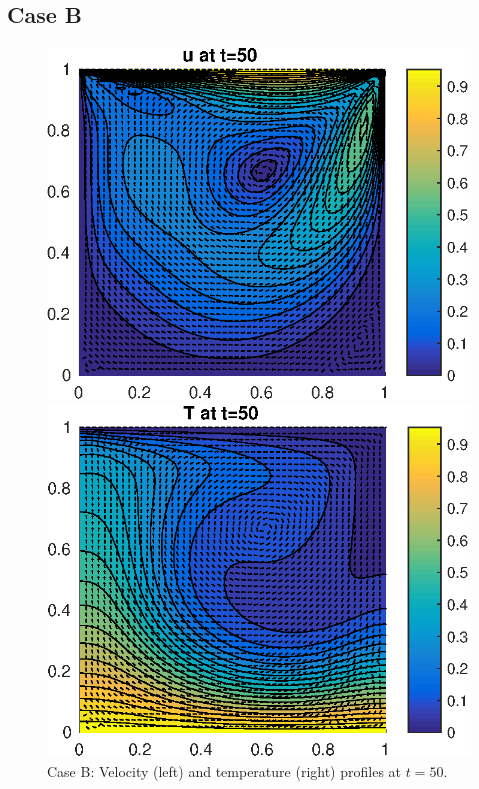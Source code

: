 \documentclass[10pt,a4paper]{article}
\begin{document}
\subsection{Case B}

\begin{figure}[H]
\centering
\begin{minipage}{.5\textwidth}
  \centering
  \includegraphics[width=.9\linewidth]{Part1_Case_B_Velocity.eps}
\end{minipage}%
\begin{minipage}{.5\textwidth}
  \centering
  \includegraphics[width=.9\linewidth]{Part1_Case_B_Temp.eps}
\end{minipage}
\caption{Case B: Velocity (left) and temperature (right) profiles at $t = 50$.}
\label{fig:1B}
\end{figure}
\end{document}
